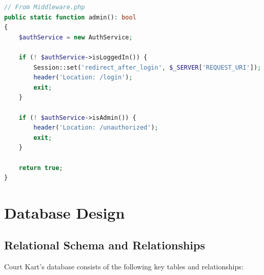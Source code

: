 \documentclass[14pt,a4paper]{article}
\begin{document}
\begin{lstlisting}[language=PHP, caption=Admin middleware protection]
// From Middleware.php
public static function admin(): bool
{
    $authService = new AuthService;

    if (! $authService->isLoggedIn()) {
        Session::set('redirect_after_login', $_SERVER['REQUEST_URI']);
        header('Location: /login');
        exit;
    }

    if (! $authService->isAdmin()) {
        header('Location: /unauthorized');
        exit;
    }

    return true;
}
\end{lstlisting}

\section{Database Design}

\subsection{Relational Schema and Relationships}

Court Kart's database consists of the following key tables and relationships:
\end{document}
